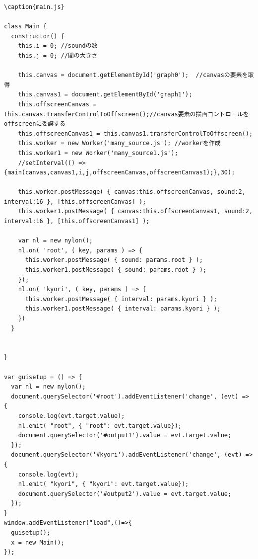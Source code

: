 \documentclass[a4j,12pt]{jsarticle}
\begin{document}
\begin{lstlisting}
\caption{main.js}

class Main {
  constructor() {
    this.i = 0; //soundの数
    this.j = 0; //間の大きさ

    this.canvas = document.getElementById('graph0');  //canvasの要素を取得
    this.canvas1 = document.getElementById('graph1');
    this.offscreenCanvas = this.canvas.transferControlToOffscreen();//canvas要素の描画コントロールをoffscreenに委譲する
    this.offscreenCanvas1 = this.canvas1.transferControlToOffscreen();
    this.worker = new Worker('many_source.js'); //workerを作成
    this.worker1 = new Worker('many_source1.js');
    //setInterval(() => {main(canvas,canvas1,i,j,offscreenCanvas,offscreenCanvas1);},30);

    this.worker.postMessage( { canvas:this.offscreenCanvas, sound:2, interval:16 }, [this.offscreenCanvas] );
    this.worker1.postMessage( { canvas:this.offscreenCanvas1, sound:2, interval:16 }, [this.offscreenCanvas1] );

    var nl = new nylon();
    nl.on( 'root', ( key, params ) => {
      this.worker.postMessage( { sound: params.root } );
      this.worker1.postMessage( { sound: params.root } );
    });
    nl.on( 'kyori', ( key, params ) => {
      this.worker.postMessage( { interval: params.kyori } );
      this.worker1.postMessage( { interval: params.kyori } );
    })
  }


}

var guisetup = () => {
  var nl = new nylon();
  document.querySelector('#root').addEventListener('change', (evt) => {
    console.log(evt.target.value);
    nl.emit( "root", { "root": evt.target.value});
    document.querySelector('#output1').value = evt.target.value;
  });
  document.querySelector('#kyori').addEventListener('change', (evt) => {
    console.log(evt);
    nl.emit( "kyori", { "kyori": evt.target.value});
    document.querySelector('#output2').value = evt.target.value;
  });
}
window.addEventListener("load",()=>{
  guisetup();
  x = new Main();
});

\end{lstlisting}
\newpage
\end{document}
